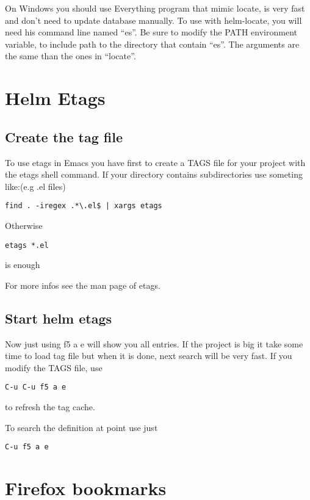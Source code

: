 \documentclass[a4paper,11pt]{article}
\begin{document}
On Windows you should use Everything program that mimic locate, is very fast and don't need to
update database manually.
To use with helm-locate, you will need his command line named ``es''.
Be sure to modify the PATH environment variable, to include path to the directory that contain ``es''.
The arguments are the same than the ones in ``locate''.

\section{Helm Etags}
\label{sec:helm-etags}

\subsection{Create the tag file}
\label{sec:create-tag-file}


To use etags in Emacs you have first to create a TAGS file for your project with the etags shell command.
If your directory contains subdirectories use someting like:(e.g .el files)
\begin{verbatim}
find . -iregex .*\.el$ | xargs etags
\end{verbatim}
Otherwise
\begin{verbatim}
etags *.el
\end{verbatim}
is enough

For more infos see the man page of etags.

\subsection{Start helm etags}
\label{sec:start-helm-etags}


Now just using f5 a e will show you all entries.
If the project is big it take some time to load tag file but when it is done, next search will be very fast.
If you modify the TAGS file, use
\begin{verbatim}
C-u C-u f5 a e
\end{verbatim}
to refresh the tag cache.

To search the definition at point use just
\begin{verbatim}
C-u f5 a e
\end{verbatim}

\section{Firefox bookmarks}
\label{sec:firefox-bookmarks}
\end{document}
